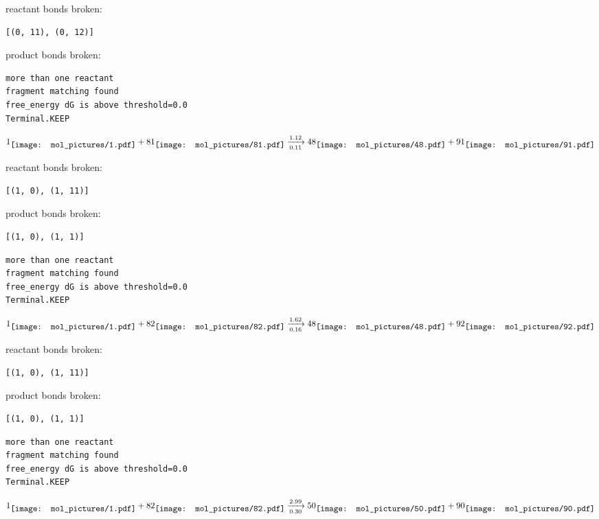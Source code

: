 \documentclass{article}
\begin{document}
reactant bonds broken:\begin{verbatim}
[(0, 11), (0, 12)]
\end{verbatim}
product bonds broken:



\vspace{1cm}
\begin{verbatim}
more than one reactant
fragment matching found
free_energy dG is above threshold=0.0
Terminal.KEEP
\end{verbatim}
$$
1
\raisebox{-.5\height}{\texttt{[image: mol\_pictures/1.pdf]}}
+
81
\raisebox{-.5\height}{\texttt{[image: mol\_pictures/81.pdf]}}
\xrightarrow[0.11]{1.12}
48
\raisebox{-.5\height}{\texttt{[image: mol\_pictures/48.pdf]}}
+
91
\raisebox{-.5\height}{\texttt{[image: mol\_pictures/91.pdf]}}
$$


reactant bonds broken:\begin{verbatim}
[(1, 0), (1, 11)]
\end{verbatim}
product bonds broken:\begin{verbatim}
[(1, 0), (1, 1)]
\end{verbatim}




\vspace{1cm}
\begin{verbatim}
more than one reactant
fragment matching found
free_energy dG is above threshold=0.0
Terminal.KEEP
\end{verbatim}
$$
1
\raisebox{-.5\height}{\texttt{[image: mol\_pictures/1.pdf]}}
+
82
\raisebox{-.5\height}{\texttt{[image: mol\_pictures/82.pdf]}}
\xrightarrow[0.16]{1.62}
48
\raisebox{-.5\height}{\texttt{[image: mol\_pictures/48.pdf]}}
+
92
\raisebox{-.5\height}{\texttt{[image: mol\_pictures/92.pdf]}}
$$


reactant bonds broken:\begin{verbatim}
[(1, 0), (1, 11)]
\end{verbatim}
product bonds broken:\begin{verbatim}
[(1, 0), (1, 1)]
\end{verbatim}




\vspace{1cm}
\begin{verbatim}
more than one reactant
fragment matching found
free_energy dG is above threshold=0.0
Terminal.KEEP
\end{verbatim}
$$
1
\raisebox{-.5\height}{\texttt{[image: mol\_pictures/1.pdf]}}
+
82
\raisebox{-.5\height}{\texttt{[image: mol\_pictures/82.pdf]}}
\xrightarrow[0.30]{2.99}
50
\raisebox{-.5\height}{\texttt{[image: mol\_pictures/50.pdf]}}
+
90
\raisebox{-.5\height}{\texttt{[image: mol\_pictures/90.pdf]}}
$$
\end{document}
